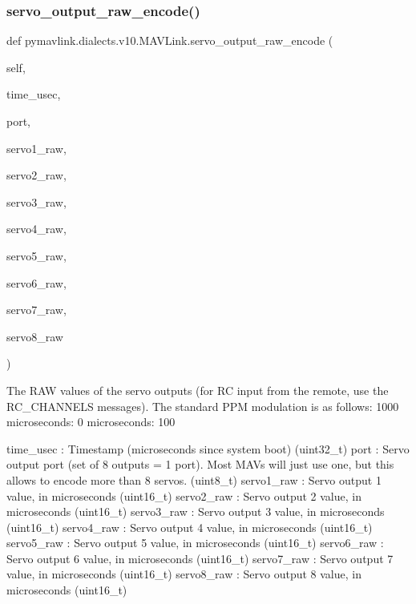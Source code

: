 \begin{DoxyVerb}
\begin{DoxyVerb}
\begin{DoxyVerb}
\begin{DoxyVerb}
\begin{DoxyVerb}
\begin{DoxyVerb}
\begin{DoxyVerb}
\begin{DoxyVerb}
\begin{DoxyVerb}
\begin{DoxyVerb}
\subsubsection{\texorpdfstring{servo\+\_\+output\+\_\+raw\+\_\+encode()}{servo\_output\_raw\_encode()}}
{\footnotesize\ttfamily def pymavlink.\+dialects.\+v10.\+M\+A\+V\+Link.\+servo\+\_\+output\+\_\+raw\+\_\+encode (\begin{DoxyParamCaption}\item[{}]{self,  }\item[{}]{time\+\_\+usec,  }\item[{}]{port,  }\item[{}]{servo1\+\_\+raw,  }\item[{}]{servo2\+\_\+raw,  }\item[{}]{servo3\+\_\+raw,  }\item[{}]{servo4\+\_\+raw,  }\item[{}]{servo5\+\_\+raw,  }\item[{}]{servo6\+\_\+raw,  }\item[{}]{servo7\+\_\+raw,  }\item[{}]{servo8\+\_\+raw }\end{DoxyParamCaption})}

\begin{DoxyVerb}The RAW values of the servo outputs (for RC input from the remote, use
the RC_CHANNELS messages). The standard PPM modulation
is as follows: 1000 microseconds: 0%
microseconds: 100%

time_usec                 : Timestamp (microseconds since system boot) (uint32_t)
port                      : Servo output port (set of 8 outputs = 1 port). Most MAVs will just use one, but this allows to encode more than 8 servos. (uint8_t)
servo1_raw                : Servo output 1 value, in microseconds (uint16_t)
servo2_raw                : Servo output 2 value, in microseconds (uint16_t)
servo3_raw                : Servo output 3 value, in microseconds (uint16_t)
servo4_raw                : Servo output 4 value, in microseconds (uint16_t)
servo5_raw                : Servo output 5 value, in microseconds (uint16_t)
servo6_raw                : Servo output 6 value, in microseconds (uint16_t)
servo7_raw                : Servo output 7 value, in microseconds (uint16_t)
servo8_raw                : Servo output 8 value, in microseconds (uint16_t)\end{DoxyVerb}
 \mbox{\label{classpymavlink_1_1dialects_1_1v10_1_1MAVLink_aa74e7d44a7d791eeaff144b6fa046119}} 

\end{DoxyVerb}
\end{DoxyVerb}
\end{DoxyVerb}
\end{DoxyVerb}
\end{DoxyVerb}
\end{DoxyVerb}
\end{DoxyVerb}
\end{DoxyVerb}
\end{DoxyVerb}
\end{DoxyVerb}
